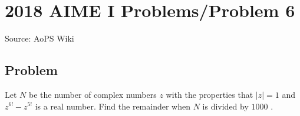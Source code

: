 \documentclass[12pt]{article}
\begin{document}
\section*{{2018 AIME I Problems/Problem 6}}
Source: AoPS Wiki

\subsection*{Problem}
Let $N$ be the number of complex numbers $z$ with the properties that $|z|=1$ and $z^{6!}-z^{5!}$ is a real number. Find the remainder when $N$ is divided by $1000$ .
\end{document}
